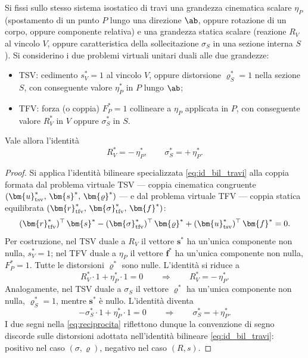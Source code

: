\begin{teorema}
	\label{thm:reciprocita}
	Si fissi sullo stesso sistema isostatico di travi una grandezza 
	cinematica scalare $\eta_P$ (spostamento di un punto $P$ lungo 
	una direzione $\ab$, oppure rotazione di un corpo, oppure 
	componente relativa) e una grandezza statica scalare 
	(reazione $R_V$ al vincolo $V$, oppure caratteristica della 
	sollecitazione $\sigma_S$ in una sezione interna $S$). Si 
	considerino i due problemi virtuali unitari duali alle due 
	grandezze:
	\begin{itemize}[noitemsep,topsep=2pt]
		\item TSV: cedimento $s^{*}_V = 1$ al vincolo $V$, oppure 
		distorsione $\varrho^{*}_S = 1$ nella sezione $S$, con 
		conseguente valore $\eta^{*}_P$ in $P$ lungo $\ab$;
		\item TFV: forza (o coppia) $F^{*}_P = 1$ collineare a 
		$\eta_P$ applicata in $P$, con conseguente valore 
		$R^{*}_V$ in $V$ oppure $\sigma^{*}_S$ in $S$.
	\end{itemize}
	Vale allora l'identità
	\begin{equation}\label{eq:reciprocita}
		\boxed{\,
			R^{*}_V = -\,\eta^{*}_P,
			\qquad
			\sigma^{*}_S = +\,\eta^{*}_P.\,}
	\end{equation}
\end{teorema}

\begin{proof}
	Si applica l'identità bilineare specializzata 
	\eqref{eq:id_bil_travi} alla coppia formata dal problema 
	virtuale TSV --- coppia cinematica congruente $(\bm{u}^{*}_{\rm 
		tsv},\, \bm{s}^{*},\, \bm{\varrho}^{*})$ --- e dal problema 
	virtuale TFV --- coppia statica equilibrata $(\bm{r}^{*}_{\rm 
		tfv},\, \bm{\sigma}^{*}_{\rm tfv},\, \bm{f}^{*})$:
	\begin{equation*}
		(\bm{r}^{*}_{\rm tfv})^\top\,\bm{s}^{*}
		- (\bm{\sigma}^{*}_{\rm tfv})^\top\,\bm{\varrho}^{*}
		+ (\bm{u}^{*}_{\rm tsv})^\top\,\bm{f}^{*} = 0.
	\end{equation*}
	Per costruzione, nel TSV duale a $R_V$ il vettore 
	$\bm{s}^{*}$ ha un'unica componente non nulla, $s^{*}_V = 1$; 
	nel TFV duale a $\eta_P$ il vettore $\bm{f}^{*}$ ha un'unica 
	componente non nulla, $F^{*}_P = 1$. Tutte le distorsioni 
	$\bm{\varrho}^{*}$ sono nulle. L'identità si riduce a
	\begin{equation*}
		R^{*}_V \cdot 1 + \eta^{*}_P \cdot 1 = 0
		\qquad\Longrightarrow\qquad
		R^{*}_V = -\,\eta^{*}_P.
	\end{equation*}
	Analogamente, nel TSV duale a $\sigma_S$ il vettore 
	$\bm{\varrho}^{*}$ ha un'unica componente non nulla, 
	$\varrho^{*}_S = 1$, mentre $\bm{s}^{*}$ è nullo. L'identità 
	diventa
	\begin{equation*}
		-\sigma^{*}_S \cdot 1 + \eta^{*}_P \cdot 1 = 0
		\qquad\Longrightarrow\qquad
		\sigma^{*}_S = +\,\eta^{*}_P.
	\end{equation*}
	I due segni nella \eqref{eq:reciprocita} riflettono dunque la 
	convenzione di segno discorde sulle distorsioni adottata 
	nell'identità bilineare \eqref{eq:id_bil_travi}: positivo nel 
	caso $(\sigma, \varrho)$, negativo nel caso $(R, s)$.
\end{proof}

